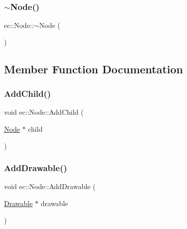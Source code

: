 \mbox{\label{classec_1_1_node_a6b2dfa6d2490ec46a5d15a326780889b}} 
\subsubsection{\texorpdfstring{$\sim$\+Node()}{~Node()}}
{\footnotesize\ttfamily ec\+::\+Node\+::$\sim$\+Node (\begin{DoxyParamCaption}{ }\end{DoxyParamCaption})\hspace{0.3cm}{\ttfamily [virtual]}}



\subsection{Member Function Documentation}
\mbox{\label{classec_1_1_node_a769243d9432b14a0c4362c98f4c89a73}} 
\subsubsection{\texorpdfstring{Add\+Child()}{AddChild()}}
{\footnotesize\ttfamily void ec\+::\+Node\+::\+Add\+Child (\begin{DoxyParamCaption}\item[{\mbox{\hyperlink{classec_1_1_node}{Node}} $\ast$}]{child }\end{DoxyParamCaption})}

\mbox{\label{classec_1_1_node_aee80ae03faf344743ab38944ce3ced5f}} 
\subsubsection{\texorpdfstring{Add\+Drawable()}{AddDrawable()}}
{\footnotesize\ttfamily void ec\+::\+Node\+::\+Add\+Drawable (\begin{DoxyParamCaption}\item[{\mbox{\hyperlink{classec_1_1_drawable}{Drawable}} $\ast$}]{drawable }\end{DoxyParamCaption})}

